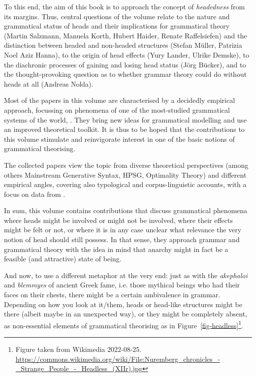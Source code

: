 \documentclass[output=paper
  ,nobabel
  ,draftmode
  ,colorlinks, citecolor=brown
]{langscibook}
\begin{document}
To this end, the aim of this book is to approach the concept of \emph{headedness} from its
margins. Thus, central questions of the volume relate to the nature and grammatical status of heads
and their implications for grammatical theory (Martin Salzmann, Manuela Korth, Hubert Haider, Renate
Raffelsiefen) and the distinction between headed and non-headed structures (Stefan Müller, Patrizia
Noel Aziz Hanna), to the origin of head effects (Yury Lander, Ulrike Demske), to the diachronic
processes of gaining and losing head status (Jörg Bücker), and to the thought-provoking question as
to whether grammar theory could do without heads at all (Andreas Nolda).

Most of the papers in this volume are characterised by a decidedly empirical approach, focussing on
phenomena of one of the most-studied grammatical systems of the world, . They bring new ideas
for grammatical modelling and use an improved theoretical toolkit. It is thus to be hoped that the
contributions to this volume stimulate and reinvigorate interest in one of the basic notions of
grammatical theorising.

The collected papers view the topic from diverse theoretical perspectives (among others Mainstream
Generative Syntax, HPSG, Optimality Theory) and different empirical angles, covering also
typological and corpus-linguistic accounts, with a focus on data from .

In sum, this volume contains contributions that discuss grammatical phenomena where heads might be
involved or might not be involved, where their effects might be felt or not, or where it is in any
case unclear what relevance the very notion of head should still possess. In that sense, they
approach grammar and grammatical theory with the idea in mind that anarchy might in fact be a
feasible (and attractive) state of being.

And now, to use a different metaphor at the very end: just as with the \emph{akephaloi} and
\emph{blemmyes} of ancient Greek fame, i.e. those mythical beings who had their faces on their
chests, there might be a certain ambivalence in grammar. Depending on how you look at it/them, heads
or head-like structures might be there (albeit maybe in an unexpected way), or they might be
completely absent, as non-essential elements of grammatical theorising as in Figure~\ref{fig-headless}\footnote{Figure taken from Wikimedia 2022-08-25. \url{https://commons.wikimedia.org/wiki/File:Nuremberg_chronicles_-_Strange_People_-_Headless_(XIIr).jpg}}.
\end{document}
